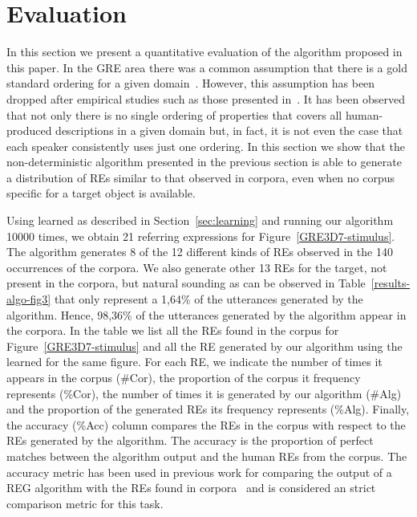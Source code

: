 \section{Evaluation}
\label{sec:evaluation}

In this section we present a quantitative evaluation of the algorithm proposed in this paper. In the GRE area there was a common assumption that there is a gold standard ordering for a given domain~\cite{Dale1995}. However, this assumption has been dropped after empirical studies such as those presented in~\cite{arec2:2008:Areces,viet:gene11}. It has been observed that not only there is no single ordering of properties that covers all human-produced descriptions in a given domain but, in fact, it is not even the case that each speaker consistently uses just one ordering. In this section we show that the non-deterministic algorithm presented in the previous section is able to generate a distribution of REs similar to that observed in corpora, even when no corpus specific for a target object is available. 

Using \puse learned as described in Section~\ref{sec:learning} and running our algorithm 10000 times, we obtain 21 referring expressions for Figure~\ref{GRE3D7-stimulus}. The algorithm generates 8 of the 12 different kinds of REs observed in the 140 occurrences of the corpora. We also generate other 13 REs for the target, not present in the corpora, but natural sounding as can be observed in Table~\ref{results-algo-fig3} that only represent a 1,64\% of the utterances generated by the algorithm. Hence, 98,36\% of the utterances generated by the algorithm appear in the corpora. In the table we list all the REs found in the corpus for Figure~\ref{GRE3D7-stimulus} and all the RE generated by our algorithm using the learned \puse for the same figure. For each RE, we indicate the number of times it appears in the corpus (\#Cor), the proportion of the corpus it frequency represents (\%Cor), the number of times it is generated by our algorithm (\#Alg) and the proportion of the generated REs its frequency represents (\%Alg). Finally, the accuracy (\%Acc) column compares the REs in the corpus with respect to the REs generated by the algorithm. The accuracy is the proportion of perfect matches between the algorithm output and the human REs from the corpus. The accuracy metric has been used in previous work for comparing the output of a REG algorithm with the REs found in corpora~\cite{sluis07:eval,viet:gene11} and is considered an strict comparison metric for this task. 

